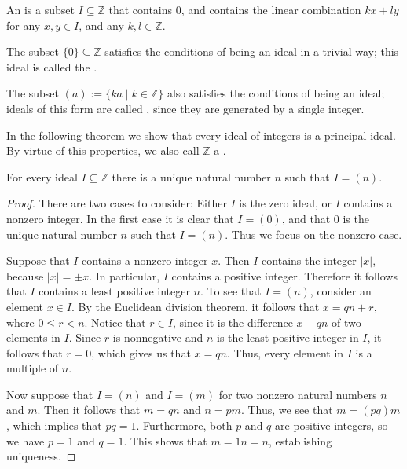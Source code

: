 \begin{definition}
  An  is a subset $I\subseteq \mathbb{Z}$ that contains $0$, and contains the linear combination $kx+ly$ for any $x,y\in I$, and any $k,l\in\mathbb{Z}$.  
\end{definition}

\begin{example}
  The subset $\{0\}\subseteq{\mathbb{Z}}$ satisfies the conditions of being an ideal in a trivial way; this ideal is called the .
\end{example}

\begin{example}
  The subset $(a):=\{ka \mid k\in\mathbb{Z}\}$ also satisfies the conditions of being an ideal; ideals of this form are called , since they are generated by a single integer.  
\end{example}

In the following theorem we show that every ideal of integers is a principal ideal. By virtue of this properties, we also call $\mathbb{Z}$ a .

\begin{theorem}
  \label{theorem:integers-principal-ideal-domain}
  For every ideal $I\subseteq\mathbb{Z}$ there is a unique natural number $n$ such that $I=(n)$.
\end{theorem}

\begin{proof}
  There are two cases to consider: Either $I$ is the zero ideal, or $I$ contains a nonzero integer. In the first case it is clear that $I=(0)$, and that $0$ is the unique natural number $n$ such that $I=(n)$. Thus we focus on the nonzero case.

  Suppose that $I$ contains a nonzero integer $x$. Then $I$ contains the integer $|x|$, because $|x|=\pm x$. In particular, $I$ contains a positive integer. Therefore it follows that $I$ contains a least positive integer $n$. To see that $I=(n)$, consider an element $x\in I$. By the Euclidean division theorem, it follows that $x=qn+r$, where $0\leq r<n$. Notice that $r\in I$, since it is the difference $x-qn$ of two elements in $I$. Since $r$ is nonnegative and $n$ is the least positive integer in $I$, it follows that $r=0$, which gives us that $x=qn$. Thus, every element in $I$ is a multiple of $n$.

  Now suppose that $I=(n)$ and $I=(m)$ for two nonzero natural numbers $n$ and $m$. Then it follows that $m=qn$ and $n=pm$. Thus, we see that $m=(pq)m$, which implies that $pq=1$. Furthermore, both $p$ and $q$ are positive integers, so we have $p=1$ and $q=1$. This shows that $m=1n=n$, establishing uniqueness.
\end{proof}

